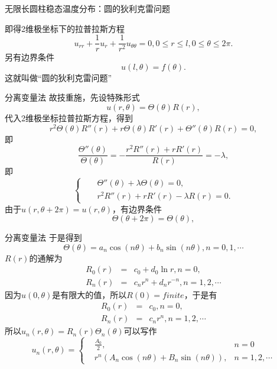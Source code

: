 \documentclass[11pt]{beamer}
\begin{document}
\begin{frame}{无限长圆柱稳态温度分布：圆的狄利克雷问题}

即得2维极坐标下的拉普拉斯方程
\begin{equation}
u_{rr} + \frac{1}{r}u_r + \frac{1}{r^2}u_{\theta \theta} = 0, 0\leq r \leq l, 0 \leq \theta \leq 2\pi.
\end{equation}
另有边界条件
\begin{equation}
u(l,\theta) = f(\theta).
\end{equation}
这就叫做“圆的狄利克雷问题”
\end{frame}

\begin{frame}{分离变量法}
故技重施，先设特殊形式
\begin{equation}
u(r,\theta) = \Theta(\theta)R(r),
\end{equation}
代入2维极坐标拉普拉斯方程，得到
\begin{equation}
r^2 \Theta(\theta) R''(r) + r \Theta(\theta)R'(r) + \Theta''(\theta)R(r) = 0,
\end{equation}
即
\begin{equation}
\frac{\Theta''(\theta)}{\Theta(\theta)} = - \frac{r^2 R''(r) + rR'(r)}{R(r)} = - \lambda,
\end{equation}
即
\begin{equation}
\left\{
\begin{aligned}
&& \Theta''(\theta) + \lambda \Theta(\theta) = 0, \\
&& r^2 R''(r) + rR'(r) - \lambda R(r) = 0.
\end{aligned}
\right.
\end{equation}
由于$u(r,\theta+2\pi) = u(r,\theta)$，有边界条件
\begin{equation}
\Theta(\theta+2\pi) = \Theta(\theta), 
\end{equation}
\end{frame}

\begin{frame}{分离变量法}
于是得到
\begin{equation}
\Theta(\theta) = a_n \cos(n\theta) + b_n \sin(n\theta), n=0,1,\cdots 
\end{equation}
$R(r)$的通解为
\begin{eqnarray}
R_0(r) &=& c_0 + d_0 \ln r, n=0, \\
R_n(r) &=& c_n r^n + d_n r^{-n}, n=1,2,\cdots 
\end{eqnarray}
因为$u(0,\theta)$是有限大的值，所以$R(0)=finite$，于是有
\begin{eqnarray}
R_0(r) &=& c_0 , n=0, \\
R_n(r) &=& c_n r^n, n=1,2,\cdots 
\end{eqnarray}
所以$u_n(r,\theta) = R_n(r) \Theta_n(\theta)$可以写作
\begin{equation}
u_n(r,\theta) = \left\{
\begin{aligned}
& \frac{A_0}{2}, & n=0 \\
& r^n (A_n \cos(n\theta) + B_n \sin(n\theta) ), & n=1,2,\cdots
\end{aligned}
\right.
\end{equation}

\end{frame}
\end{document}
